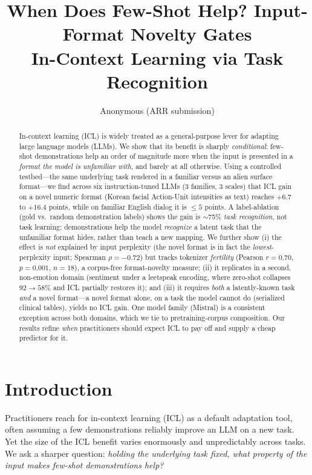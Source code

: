 \documentclass[11pt]{article}
\title{\bf When Does Few-Shot Help? Input-Format Novelty Gates\\
In-Context Learning via Task Recognition}
\author[ ]{Anonymous (ARR submission)}
\affil[ ]{ }
\date{}
\begin{document}
\maketitle

\begin{abstract}
In-context learning (ICL) is widely treated as a general-purpose lever for adapting
large language models (LLMs). We show that its benefit is sharply \emph{conditional}:
few-shot demonstrations help an order of magnitude more when the input is presented
in a \emph{format the model is unfamiliar with}, and barely at all otherwise.
Using a controlled testbed---the same underlying task rendered in a familiar versus an
alien surface format---we find across six instruction-tuned LLMs (3 families, 3 scales)
that ICL gain on a novel numeric format (Korean facial Action-Unit intensities as text)
reaches $+6.7$ to $+16.4$ points, while on familiar English dialog it is $\le 5$ points.
A label-ablation (gold vs.\ random demonstration labels) shows the gain is
$\sim$75\% \emph{task recognition}, not task learning: demonstrations help the model
\emph{recognize} a latent task that the unfamiliar format hides, rather than teach a new
mapping. We further show (i) the effect is \emph{not} explained by input perplexity
(the novel format is in fact the \emph{lowest}-perplexity input; Spearman
$\rho=-0.72$) but tracks tokenizer \emph{fertility}
(Pearson $r=0.70$, $p{=}0.001$, $n{=}18$), a corpus-free format-novelty measure; (ii) it replicates
in a second, non-emotion domain (sentiment under a leetspeak encoding, where zero-shot
collapses $92\!\to\!58$\% and ICL partially restores it); and (iii) it requires
\emph{both} a latently-known task \emph{and} a novel format---a novel format alone, on a
task the model cannot do (serialized clinical tables), yields no ICL gain. One model
family (Mistral) is a consistent exception across both domains, which we tie to
pretraining-corpus composition. Our results refine \emph{when} practitioners should
expect ICL to pay off and supply a cheap predictor for it.
\end{abstract}

\section{Introduction}
Practitioners reach for in-context learning (ICL) as a default adaptation tool, often
assuming a few demonstrations reliably improve an LLM on a new task. Yet the size of the
ICL benefit varies enormously and unpredictably across tasks. We ask a sharper question:
\emph{holding the underlying task fixed, what property of the input makes few-shot
demonstrations help?}
\end{document}
